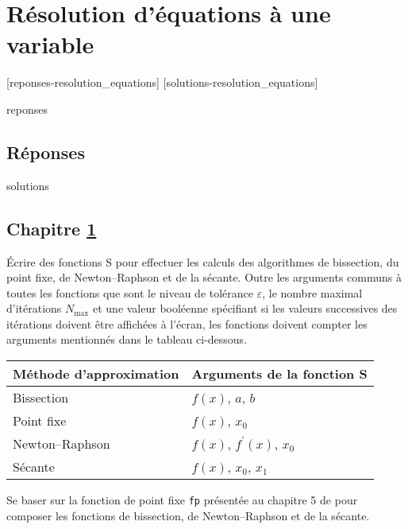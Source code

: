 \chapter{Résolution d'équations à une variable}
\label{chap:resolution}


[reponses-resolution_equations]
[solutions-resolution_equations]

\begin{Filesave}{reponses}
\bigskip
\section*{Réponses}

\end{Filesave}

\begin{Filesave}{solutions}
\section*{Chapitre \ref{chap:resolution}}

\end{Filesave}



\begin{exercice}
  Écrire des fonctions S pour effectuer les calculs des algorithmes de
  bissection, du point fixe, de Newton--Raphson et de la sécante.
  Outre les arguments communs à toutes les fonctions que sont le
  niveau de tolérance $\varepsilon$, le nombre maximal d'itérations
  $N_{\mathrm{max}}$ et une valeur booléenne spécifiant si les valeurs
  successives des itérations doivent être affichées à l'écran, les
  fonctions doivent compter les arguments mentionnés dans le tableau
  ci-dessous.
  \begin{center}
    \begin{tabular}{ll}
      \toprule
      Méthode d'approximation & Arguments de la fonction S \\
      \midrule
      Bissection & $f(x)$, $a$, $b$ \\
      Point fixe & $f(x)$, $x_0$ \\
      Newton--Raphson & $f(x)$, $f^\prime(x)$, $x_0$ \\
      Sécante & $f(x)$, $x_0$, $x_1$ \\
      \bottomrule
    \end{tabular}
  \end{center}
  \begin{sol}
    Se baser sur la fonction de point fixe \texttt{fp} présentée au
    chapitre 5 de \cite{Goulet_intro_S} pour composer les fonctions de
    bissection, de Newton--Raphson et de la sécante.
  \end{sol}
\end{exercice}

